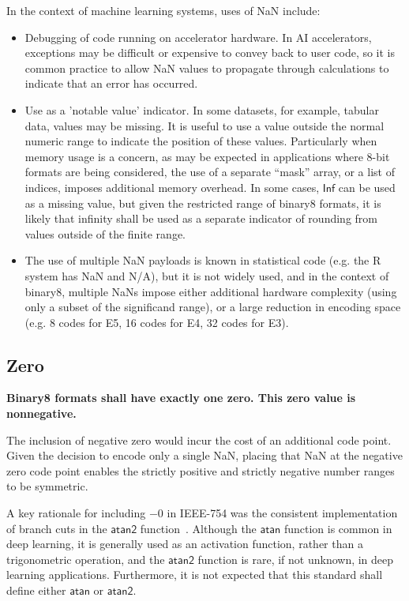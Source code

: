 \documentclass{article}
\def\val#1{$\mathsf{#1}$}
\newcommand{\spec}[1]{{\bf #1}}
\begin{document}
In the context of machine learning systems, uses of NaN include:
\begin{itemize}
\item
Debugging of code running on accelerator hardware.
In AI accelerators, exceptions may be difficult or expensive to convey back to user code, so it is common practice to allow NaN values to propagate through calculations to indicate that an error has occurred.
\item
Use as a 'notable value' indicator.
In some datasets, for example, tabular data, values may be missing.
It is useful to use a value outside the normal numeric range to indicate the position of these values.
Particularly when memory usage is a concern, as may be expected in applications where 8-bit formats are being considered, the use of a separate “mask” array, or a list of indices, imposes additional memory overhead.
In some cases, \val{Inf} can be used as a missing value, but given the restricted range of binary8 formats, it is likely that infinity shall be used as a separate indicator of rounding from values outside of the finite range.
\item 
The use of multiple NaN payloads is known in statistical code (e.g. the R system has NaN and N/A), but it is not widely used, and in the context of binary8, multiple NaNs impose either additional hardware complexity (using only a subset of the significand range), or a large reduction in encoding space (e.g. 8 codes for E5, 16 codes for E4, 32 codes for E3).
\end{itemize}

\subsection{Zero}
\spec{Binary8 formats shall have exactly one zero. This zero value is nonnegative.}

The inclusion of negative zero would incur the cost of an additional code point. Given the decision to encode only a single NaN, placing that NaN at the negative zero code point enables the strictly positive and strictly negative number ranges to be symmetric.

A key rationale for including $-0$ in IEEE-754 was the consistent implementation of branch cuts in the \val{atan2} function~\cite{kahan87,kahanthomas91}.
Although the \val{atan} function is common in deep learning, it is generally used as an activation function, rather than a trigonometric operation, and the \val{atan2} function is rare, if not unknown, in deep learning applications.
Furthermore, it is not expected that this standard shall define either \val{atan} or \val{atan2}.
\end{document}
